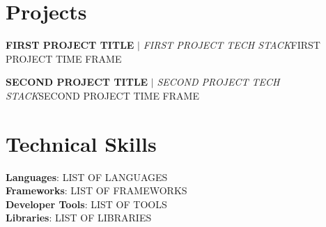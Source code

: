 \resumeSubHeadingListEnd



\section{Projects}
\resumeSubHeadingListStart

  \resumeProjectHeading
    {\textbf{FIRST PROJECT TITLE} $|$ \emph{FIRST PROJECT TECH STACK}}{FIRST PROJECT TIME FRAME}
    \resumeItemListStart
    \resumeItemListEnd

  \resumeProjectHeading
    {\textbf{SECOND PROJECT TITLE} $|$ \emph{SECOND PROJECT TECH STACK}}{SECOND PROJECT TIME FRAME}
    \resumeItemListStart
    \resumeItemListEnd

\resumeSubHeadingListEnd


%
\section{Technical Skills}
\begin{itemize}[leftmargin=0.15in, label={}]
  \small{\item{
    \textbf{Languages}{: LIST OF LANGUAGES} \\
    \textbf{Frameworks}{: LIST OF FRAMEWORKS} \\
    \textbf{Developer Tools}{: LIST OF TOOLS} \\
    \textbf{Libraries}{: LIST OF LIBRARIES}
  }}
\end{itemize}



